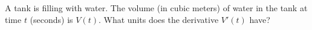 A tank is filling with water.  The volume (in cubic meters) of water in
the tank at time $t$ (seconds) is $V(t)$.  What units does the
derivative $V'(t)$ have?
